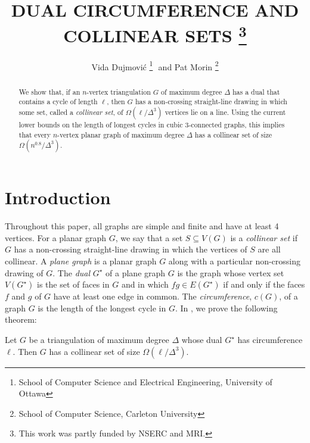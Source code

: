 \documentclass{patmorin}
\title{\MakeUppercase{Dual Circumference and Collinear Sets}%
    \thanks{This work was partly funded by NSERC and MRI.}}
\author{Vida Dujmovi\'c%
        \thanks{School of Computer Science and Electrical Engineering,
                University of Ottawa}\,\, and
        Pat Morin%
        \thanks{School of Computer Science, Carleton University}}
\newcommand{\dual}[1]{{#1}^\star}
\begin{document}
\maketitle


\begin{abstract}
   We show that, if an $n$-vertex triangulation $G$ of maximum degree
   $\Delta$ has a dual that contains a cycle of length $\ell$, then $G$
   has a non-crossing straight-line drawing in which some set, called
   a \emph{collinear set}, of $\Omega(\ell/\Delta^3)$ vertices lie on
   a line.  Using the current lower bounds on the length of longest cycles
   in cubic 3-connected graphs, this implies that every $n$-vertex
   planar graph of maximum degree $\Delta$ has a collinear set of size
   $\Omega(n^{0.8}/\Delta^3)$.
\end{abstract}

\section{Introduction}

Throughout this paper, all graphs are simple and finite and have at least
4 vertices.  For a planar graph $G$, we say that a set $S\subseteq V(G)$
is a \emph{collinear set} if $G$ has a non-crossing straight-line drawing
in which the vertices of $S$ are all collinear.  A \emph{plane graph} is
a planar graph $G$ along with a particular non-crossing drawing of $G$.
The \emph{dual} $\dual{G}$ of a plane graph $G$ is the graph whose
vertex set $V(\dual{G})$ is the set of faces in $G$ and in which $fg\in
E(\dual{G})$ if and only if the faces $f$ and $g$ of $G$ have at least
one edge in common.  The \emph{circumference}, $c(G)$, of a graph $G$
is the length of the longest cycle in $G$. In , we prove
the following theorem:

\begin{thm}
  Let $G$ be a triangulation of maximum degree $\Delta$ whose dual
  $\dual{G}$ has circumference $\ell$. Then $G$ has a collinear set of
  size $\Omega(\ell/\Delta^3)$.
\end{thm}
\end{document}
